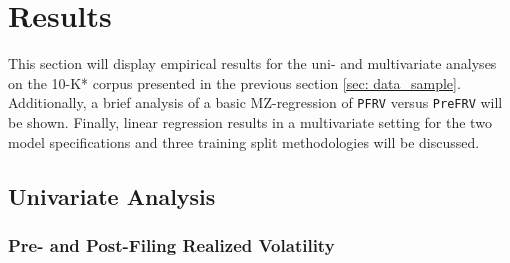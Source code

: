 \section{Results}
\label{sec: results}
This section will display empirical results for the uni- and multivariate analyses on the 10-K* corpus presented in the previous section \ref{sec: data_sample}. Additionally, a brief analysis of a basic MZ-regression of \texttt{PFRV} versus \texttt{PreFRV} will be shown. Finally, linear regression results in a multivariate setting for the two model specifications and three training split methodologies will be discussed. 


\subsection{Univariate Analysis}
\label{ssec: results_univariate}

\subsubsection{Pre- and Post-Filing Realized Volatility}
\label{sssec: results_correls_mz}

